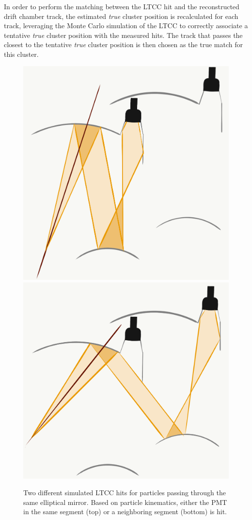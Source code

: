 In order to perform the matching between the LTCC hit and the reconstructed drift chamber track, the estimated
\textit{true} cluster position is recalculated for each track, leveraging the Monte Carlo simulation of the LTCC to
correctly associate a tentative \textit{true} cluster position with the measured hits. The track that passes the
closest to the tentative \textit{true} cluster position is then chosen as the true match for this cluster.

\begin{figure}[!ht]
  \centering
  \includegraphics[width=0.9\columnwidth, keepaspectratio]{img/LTCC-event-1.png}
  \includegraphics[width=0.9\columnwidth, keepaspectratio]{img/LTCC-event-2.png}
  \caption{Two different simulated LTCC hits for particles passing through the same elliptical mirror. Based on
    particle kinematics, either the PMT in the same segment (top) or a neighboring segment (bottom) is hit.}
  \label{fig:trackmatching}
\end{figure}

